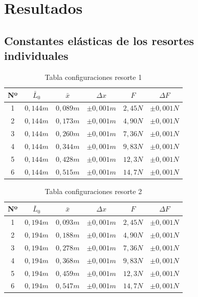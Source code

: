 \documentclass[12pt,a4paper]{article}
\begin{document}
\section{Resultados}

\subsection{Constantes elásticas de los resortes individuales}

\begin{table}[H]
    \centering
    \caption{Tabla configuraciones resorte 1}
    \label{tab:tabla1}
    \begin{tabular}{c c c c c c}
        \toprule
        Nº & $\bar{L}_0$ & $\bar{x}$ & $\Delta{x}$ & $F$ & $\Delta{F}$ \\
        \midrule
        1 & $0,144 m$ & $0,089 m$ & $\pm{0,001} m$ & $2,45 N$ & $\pm{0,001} N$ \\
        2 & $0,144 m$ & $0,173 m$ & $\pm{0,001} m$ & $4,90 N$ & $\pm{0,001} N$ \\
        3 & $0,144 m$ & $0,260 m$ & $\pm{0,001} m$ & $7,36 N$ & $\pm{0,001} N$ \\
        4 & $0,144 m$ & $0,344 m$ & $\pm{0,001} m$ & $9,83 N$ & $\pm{0,001} N$ \\
        5 & $0,144 m$ & $0,428 m$ & $\pm{0,001} m$ & $12,3 N$ & $\pm{0,001} N$ \\
        6 & $0,144 m$ & $0,515 m$ & $\pm{0,001} m$ & $14,7 N$ & $\pm{0,001} N$ \\
         \bottomrule
    \end {tabular}
\end{table}

\begin{table}[H]
    \centering
    \caption{Tabla configuraciones resorte 2}
    \label{tab:tabla2}
    \begin{tabular}{c c c c c c}
        \toprule
        Nº & $\bar{L}_0$ & $\bar{x}$ & $\Delta{x}$ & $F$ & $\Delta{F}$ \\
        \midrule
        1 & $0,194 m$ & $0,093 m$ & $\pm{0,001} m$ & $2,45 N$ & $\pm{0,001} N$ \\
        2 & $0,194 m$ & $0,188 m$ & $\pm{0,001} m$ & $4,90 N$ & $\pm{0,001} N$ \\
        3 & $0,194 m$ & $0,278 m$ & $\pm{0,001} m$ & $7,36 N$ & $\pm{0,001} N$ \\
        4 & $0,194 m$ & $0,368 m$ & $\pm{0,001} m$ & $9,83 N$ & $\pm{0,001} N$ \\
        5 & $0,194 m$ & $0,459 m$ & $\pm{0,001} m$ & $12,3 N$ & $\pm{0,001} N$ \\
        6 & $0,194 m$ & $0,547 m$ & $\pm{0,001} m$ & $14,7 N$ & $\pm{0,001} N$ \\
        \bottomrule
    \end{tabular}
\end{table}
\end{document}

